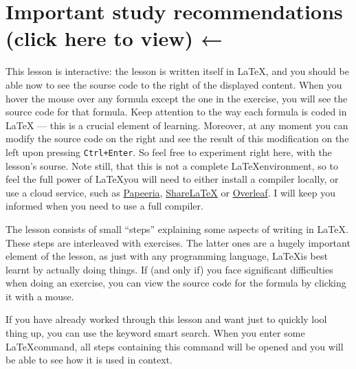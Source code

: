 \section{Important study recommendations (click here to view) ←}
\par This lesson is interactive: the lesson is written itself in \LaTeX, and you should be able now to see the sourse code to the right of the displayed content. When you hover the mouse over any formula except the one in the exercise, you will see the source code for that formula. Keep attention to the way each formula is coded in LaTeX — this is a crucial element of learning. Moreover, at any moment you can modify the source code on the right and see the result of this modification on the left upon pressing \verb"Ctrl+Enter". So feel free to experiment right here, with the lesson’s sourse. Note still, that this is not a complete \LaTeX environment, so to feel the full power of \LaTeX you will need to either install a compiler locally, or use a cloud service, such as \href{https://papeeria.com/landing}{Papeeria}, \href{https://www.sharelatex.com/}{ShareLaTeX} or \href{https://www.overleaf.com/index_b}{Overleaf}. I will keep you informed when you need to use a full compiler.
\par The lesson consists of small “steps” explaining some aspects of writing in \LaTeX. These steps are interleaved with exercises. The latter ones are a hugely important element of the lesson, as just with any programming language, \LaTeX is best learnt by actually doing things. If (and only if) you face significant difficulties when doing an exercise, you can view the source code for the formula by clicking it with a mouse.
\par If you have already worked through this lesson and want just to quickly lool thing up, you can use the keyword smart search. When you enter some \LaTeX command, all steps containing this command will be opened and you will be able to see how it is used in context.